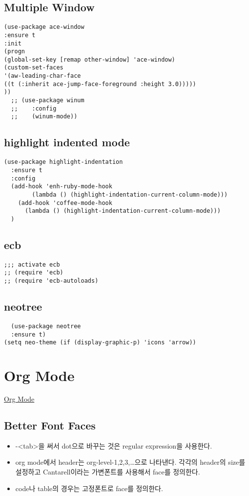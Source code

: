 \documentclass[11pt]{article}
\begin{document}
\subsection*{Multiple Window}
\label{sec:org8cae41a}
\begin{verbatim}
(use-package ace-window
:ensure t
:init
(progn
(global-set-key [remap other-window] 'ace-window)
(custom-set-faces
'(aw-leading-char-face
((t (:inherit ace-jump-face-foreground :height 3.0)))))
))
  ;; (use-package winum
  ;;    :config
  ;;    (winum-mode))
\end{verbatim}

\subsection*{highlight indented mode}
\label{sec:org8bea133}
\begin{verbatim}
(use-package highlight-indentation
  :ensure t
  :config
  (add-hook 'enh-ruby-mode-hook
	    (lambda () (highlight-indentation-current-column-mode)))
    (add-hook 'coffee-mode-hook
	  (lambda () (highlight-indentation-current-column-mode)))
  )
\end{verbatim}

\subsection*{ecb}
\label{sec:orgb143d43}
\begin{verbatim}
;;; activate ecb
;; (require 'ecb)
;; (require 'ecb-autoloads)
\end{verbatim}

\subsection*{neotree}
\label{sec:org1dfa8a8}
\begin{verbatim}
  (use-package neotree
  :ensure t)
(setq neo-theme (if (display-graphic-p) 'icons 'arrow))
\end{verbatim}
\section*{Org Mode}
\label{sec:org97d76f4}
\href{https://orgmode.org/}{Org Mode} 
\subsection*{Better Font Faces}
\label{sec:org4bd4878}
\begin{itemize}
\item -<tab>을 써서 dot으로 바꾸는 것은 regular expression을 사용한다.
\item org mode에서 header는 org-level-1,2,3,\ldots{}으로 나타낸다. 각각의 header의 size를 설정하고 Cantarell이라는 가변폰트를 사용해서 face를 정의한다.
\item code나 table의 경우는 고정폰트로 face를 정의한다.
\end{itemize}
\end{document}

